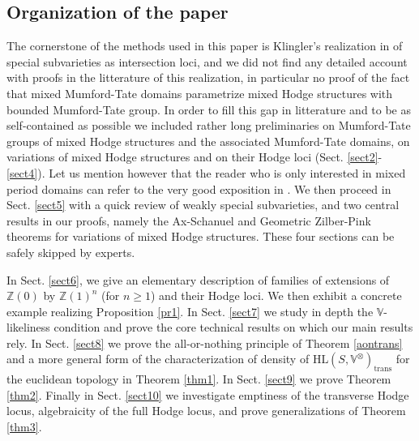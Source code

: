 \documentclass[10pt]{article}
\numberwithin{equation}{subsection}
\theoremstyle{plain}
\theoremstyle{definition}
\theoremstyle{remark}
\newcommand{\Z}{\mathbb Z}
\newcommand{\V}{\mathbb V}
\newcommand{\HL}{\mathrm{HL}(S, \V^\otimes)}
\newcommand{\trans}{\mathrm{trans}}
\begin{document}
\subsection*{Organization of the paper}
The cornerstone of the methods used in this paper is Klingler's realization in \cite{klingler_atyp} of special subvarieties as intersection loci, and we did not find any detailed account with proofs in the litterature of this realization, in particular no proof of the fact that mixed Mumford-Tate domains parametrize mixed Hodge structures with bounded Mumford-Tate group. In order to fill this gap in litterature and to be as self-contained as possible we included rather long preliminaries on Mumford-Tate groups of mixed Hodge structures and the associated Mumford-Tate domains, on variations of mixed Hodge structures and on their Hodge loci (Sect. \ref{sect2}-\ref{sect4}). Let us mention however that the reader who is only interested in mixed period domains can refer to the very good exposition in \cite[Sect. 2-4]{pearls}. We then proceed in Sect. \ref{sect5} with a quick review of weakly special subvarieties, and two central results in our proofs, namely the Ax-Schanuel and Geometric Zilber-Pink theorems for variations of mixed Hodge structures. These four sections can be safely skipped by experts.

In Sect. \ref{sect6}, we give an elementary description of families of extensions of $\Z(0)$ by $\Z(1)^n$ (for $n \geqslant 1$) and their Hodge loci. We then exhibit a concrete example realizing Proposition \ref{pr1}. In Sect. \ref{sect7} we study in depth the $\V$-likeliness condition and prove the core technical results on which our main results rely. In Sect. \ref{sect8} we prove the all-or-nothing principle of Theorem \ref{aontrans} and a more general form of the characterization of density of $\HL_\trans$ for the euclidean topology in Theorem \ref{thm1}. In Sect. \ref{sect9} we prove Theorem \ref{thm2}. Finally in Sect. \ref{sect10} we investigate emptiness of the transverse Hodge locus, algebraicity of the full Hodge locus, and prove generalizations of Theorem \ref{thm3}.
\end{document}
